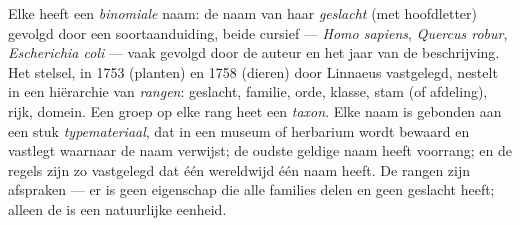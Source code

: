 \begin{definition}\label{def:b1:classifying-biodiversity:nomenclature}
Elke  heeft een \emph{binomiale} naam: de naam van haar
\emph{geslacht} (met hoofdletter) gevolgd door een soortaanduiding, beide
cursief --- \emph{Homo sapiens}, \emph{Quercus robur},
\emph{Escherichia coli} --- vaak gevolgd door de auteur en het jaar van de
beschrijving. Het stelsel, in 1753 (planten) en 1758 (dieren) door Linnaeus
vastgelegd, nestelt  in een hiërarchie van \emph{rangen}: geslacht,
familie, orde, klasse, stam (of afdeling), rijk, domein. Een groep op elke
rang heet een \emph{taxon}. Elke naam is gebonden aan een stuk
\emph{typemateriaal}, dat in een museum of herbarium wordt bewaard en
vastlegt waarnaar de naam verwijst; de oudste geldige naam heeft voorrang; en
de regels zijn zo vastgelegd dat één  wereldwijd één naam heeft. De
rangen zijn afspraken --- er is geen eigenschap die alle families delen en
geen geslacht heeft; alleen de  is een natuurlijke eenheid.
\end{definition}

